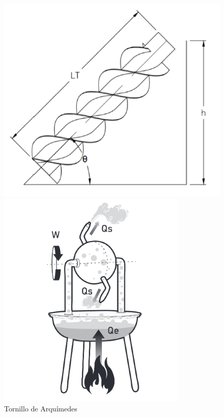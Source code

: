 \begin{figure}[ht!]
	\centering
	\begin{minipage}{0.3\linewidth}
		\centering
		\includegraphics[width=\linewidth]{figs/arquimedes.png}
		\caption*{\centering Tornillo de Arquímedes \cite{cuenca2023diseno}}
	\end{minipage}
	\hspace{3cm}
	\begin{minipage}{0.3\linewidth}
		\centering
		\includegraphics[width=\linewidth]{figs/eolipila.png}

\end{minipage}
\end{figure}
